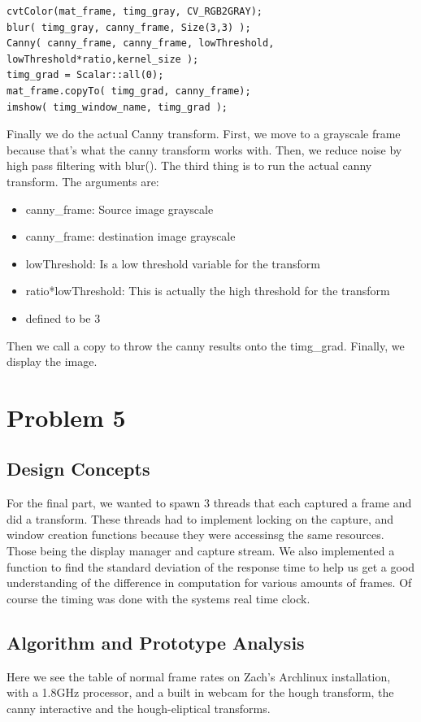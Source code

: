 \documentclass{article}
\begin{document}
\begin{lstlisting}
cvtColor(mat_frame, timg_gray, CV_RGB2GRAY);
blur( timg_gray, canny_frame, Size(3,3) );
Canny( canny_frame, canny_frame, lowThreshold, lowThreshold*ratio,kernel_size );
timg_grad = Scalar::all(0);
mat_frame.copyTo( timg_grad, canny_frame);
imshow( timg_window_name, timg_grad );
\end{lstlisting}
Finally we do the actual Canny transform. First, we move to a grayscale frame because that's what the canny transform works with. Then, we reduce noise by high pass filtering with blur(). The third thing is to run the actual canny transform. The arguments are:
\begin{itemize}
    \item canny\_frame: Source image grayscale
    \item canny\_frame: destination image grayscale
    \item lowThreshold: Is a low threshold variable for the transform
    \item ratio*lowThreshold: This is actually the high threshold for the transform
    \item defined to be 3
\end{itemize}
Then we call a copy to throw the canny results onto the timg\_grad. Finally, we display the image.


\section*{Problem 5}
\subsection*{Design Concepts}
For the final part, we wanted to spawn 3 threads that each captured a frame and did a transform. These threads had to implement locking on the capture, and window creation functions because they were accessinsg the same resources. Those being the display manager and capture stream. We also implemented a function to find the standard deviation of the response time to help us get a good understanding of the difference in computation for various amounts of frames. Of course the timing
was done with the systems real time clock.

\subsection*{Algorithm and Prototype Analysis}
Here we see the table of normal frame rates on Zach's Archlinux installation, with a 1.8GHz processor, and a built in webcam for the hough transform, the canny interactive and the hough-eliptical transforms.
\end{document}
